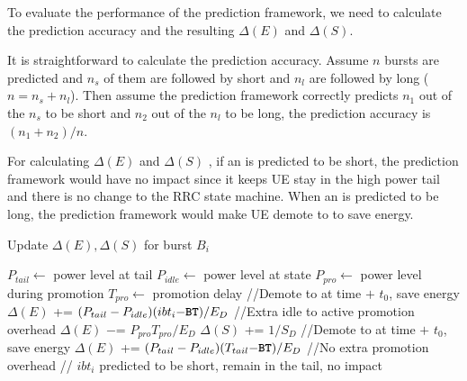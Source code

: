 \label{sec:method.eval}


To evaluate the performance of the prediction framework, we need to calculate the prediction accuracy and the resulting $\Delta(E)$ and $\Delta(S)$.

It is straightforward to calculate the prediction accuracy. Assume $n$ bursts are predicted and $n_{s}$ of them are followed by short \IBTS and $n_{l}$ are followed by long \IBTS ($n = n_{s} + n_{l}$). Then assume the prediction framework correctly predicts $n_{1}$ out of the $n_{s}$ \IBTS to be short and $n_{2}$ out of the $n_{l}$ \IBTS to be long, the prediction accuracy is $(n_{1} + n_{2}) / n$.

For calculating $\Delta(E)$ and $\Delta(S)$ , if an \IBT is predicted to be short, the prediction framework would have no impact since it keeps UE stay in the high power tail and there is no change to the RRC state machine. When an \IBT is predicted to be long, the prediction framework would make UE demote to \RI to save energy.

\begin{algorithm}[t]
\caption{Update $\Delta(E), \Delta(S)$ for burst $B_{i}$}
\begin{algorithmic}
\STATE $P_{tail} \leftarrow $ power level at \RC tail
\STATE $P_{idle} \leftarrow $ power level at \RI state
\STATE $P_{pro} \leftarrow $ power level during promotion
\STATE $T_{pro} \leftarrow $ promotion delay
\STATE //Demote to \RI at time \BT $+$ $t_{0}$, save energy
\STATE $\Delta(E) $ += $(P_{tail} - P_{idle}) (ibt_{i} - \BT) / E_{D}$
\STATE //Extra idle to active promotion overhead
\STATE $\Delta(E) $ $-$= $P_{pro} T_{pro} / E_{D}$
\STATE $\Delta(S) $ += $1 / S_{D}$
\ELSE
\STATE //Demote to \RI at time \BT$+$ $t_{0}$, save energy
\STATE $\Delta(E) $ += $(P_{tail} - P_{idle}) (T_{tail} - \BT) / E_{D}$
\STATE //No extra promotion overhead
\ENDIF
\ELSE
\STATE // $ibt_{i}$ predicted to be short, remain in the tail, no impact
\ENDIF
\end{algorithmic}
\label{algo:update}
\end{algorithm}



